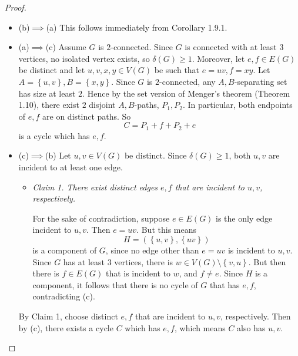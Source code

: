 \documentclass[co342]{subfiles}
\begin{document}
    \begin{proof}
        \begin{itemize}
            \item (b)$\implies$(a) This follows immediately from Corollary 1.9.1.
            \item (a)$\implies$(c) Assume $G$ is $2$-connected. Since $G$ is connected with at least $3$ vertices, no isolated vertex exists, so $\delta\left( G \right)\geq 1$. Moreover, let $e,f\in E\left( G \right)$ be distinct and let $u,v,x,y\in V\left( G \right)$ be such that $e=uv, f=xy$. Let $A=\left\lbrace u,v \right\rbrace, B=\left\lbrace x,y \right\rbrace$. Since $G$ is $2$-connected, any $A,B$-separating set has size at least $2$. Hence by the set version of Menger's theorem (Theorem 1.10), there exist $2$ disjoint $A,B$-paths, $P_1,P_2$. In particular, both endpoints of $e,f$ are on distinct paths. So
                \begin{equation*}
                    C = P_1+f+P_2+e
                \end{equation*}
                is a cycle which has $e,f$.
            \item (c)$\implies$(b) Let $u,v\in V\left( G \right)$ be distinct. Since $\delta\left( G \right)\geq 1$, both $u,v$ are incident to at least one edge.
                \begin{itemize}
                    \item \textit{Claim 1. There exist distinct edges $e,f$ that are incident to $u,v$, respectively.}

                        \begin{subproof}
                            For the sake of contradiction, suppose $e\in E\left( G \right)$ is the only edge incident to $u,v$. Then $e=uv$. But this means
                            \begin{equation*}
                                H =\left( \left\lbrace u,v \right\rbrace, \left\lbrace uv \right\rbrace \right)
                            \end{equation*}
                            is a component of $G$, since no edge other than $e=uv$ is incident to $u,v$. Since $G$ has at least $3$ vertices, there is $w\in V\left( G \right)\setminus \left\lbrace v,u \right\rbrace$. But then there is $f\in E\left( G \right)$ that is incident to $w$, and $f\neq e$. Since $H$ is a component, it follows that there is no cycle of $G$ that has $e,f$, contradicting (c). 
                        \end{subproof}
                \end{itemize} 
                By Claim 1, choose distinct $e,f$ that are incident to $u,v$, respectively. Then by (c), there exists a cycle $C$ which has $e,f$, which means $C$ also has $u,v$.\qqedsym
        \end{itemize} 
    \end{proof}
\end{document}
